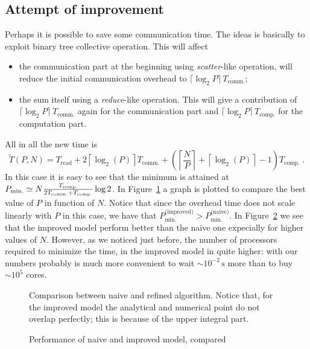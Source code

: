 \documentclass[11pt,a4paper]{article}
\newcommand{\mr}{\ensuremath{\mathrm}}
\numberwithin{equation}{section}
\begin{document}
\subsection{Attempt of improvement}
Perhaps it is possible to save some communication time. The ideas is basically to exploit binary tree collective operation. This will affect
\begin{itemize}
    \item  the communication part at the beginning using \textit{scatter}-like operation, will reduce the initial communication overhead to $\lceil\log_2 P\rceil\,T_{\text{comm.}}$;
    \item the sum itself using a \textit{reduce}-like operation. This will give a contribution of $\lceil\log_2 P\rceil\,T_{\text{comm.}}$ again for the communication part and $\lceil\log_2 P\rceil\,T_{\text{comp.}}$ for the computation part.
\end{itemize}    
All in all the new time is
\begin{equation}
\tilde{T}(P,N) = T_{\text{read}} + 2\left\lceil \log_2(P)\right\rceil T_{\text{comm.}} + \left(\left\lceil\frac{N}{P}\right\rceil+\left\lceil \log_2(P)\right\rceil -1\right)T_{\text{comp.}}\;.
\end{equation}
In this case it is easy to see that the minimum is attained at $P_{\mr{min.}} \simeq N\frac{T_{\text{comp.}}}{2T_{\text{comm.}}+T_{\text{comp.}}}\log 2$. In Figure~\ref{fig:th_mod_4} a graph is plotted to compare the best value of $P$ in function of $N$. Notice that since the overhead time does not scale linearly with $P$ in this case, we have that $P_{\text{min.}}^{\text{(improved)}} > P_{\text{min.}}^{\text{(naive)}}$. In Figure~\ref{fig:th_mod_5} we see that the improved model perform better than the naive one expecially for higher values of $N$. However, as we noticed just before, the number of processors required to minimize the time, in the improved model in quite higher: with our numbers probably is much more convenient to wait $\sim 10^{-2}\,\text{s}$ more than to buy $\sim 10^5$ cores. 
\begin{figure}[htbp]
    \centering
    
    \caption{Comparison between naive and refined algorithm. Notice that, for the improved model the analytical and numerical point do not overlap perfectly; this is because of the upper integral part.}
    \label{fig:th_mod_4}
\end{figure}

\begin{figure}[htbp]
    \centering
    \hspace*{-1cm}
    
    \caption{Performance of naive and improved model, compared}
    \label{fig:th_mod_5}
\end{figure}
\end{document}
